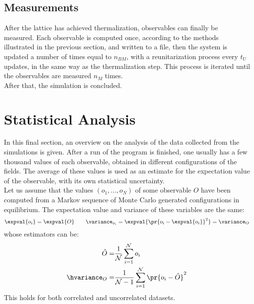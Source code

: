 \subsection{Measurements}
After the lattice has achieved thermalization, observables can finally be measured.
Each observable is computed once, according to the methods illustrated in the previous section, and written to a file, then the system is updated a number of times equal to $n_{BM}$, with a reunitarization process every $t_U$ updates, in the same way as the thermalization step.
This process is iterated until the observables are measured $n_M$ times.\\
After that, the simulation is concluded.

\section{Statistical Analysis}
In this final section, an overview on the analysis of the data collected from the simulations is given.
After a run of the program is finished, one usually has a few thousand values of each observable, obtained in different configurations of the fields.
The average of these values is used as an estimate for the expectation value of the observable, with its own statistical uncertainty.\\
Let us assume that the values $(o_1,\dots,o_N)$ of some observable $O$ have been computed from a Markov sequence of Monte Carlo generated configurations in equilibrium.
The expectation value and variance of these variables are the same:
\begin{equation}
    \expval{o_i} = \expval{O} \qquad \variance_{o_i} = \expval{\pr{o_i-\expval{o_i}}^2} = \variance_O
\end{equation}
whose estimators can be:
\begin{align}
    \hat{O} =& \frac{1}{\mathcal{N}}\sum_{i=1}^\mathcal{N} o_i \label{2:ExpVal}\\
    \hvariance_O =& \frac1{\mathcal{N}-1}\sum_{i=1}^\mathcal{N}\pr{o_i-\hat{O}}^2 \label{2:Variance}
\end{align}
This holds for both correlated and uncorrelated datasets.

